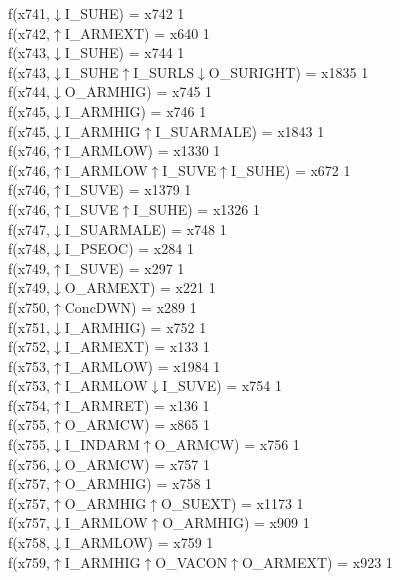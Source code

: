 f(x741,$\downarrow$I\_SUHE) = x742 {1} \\
f(x742,$\uparrow$I\_ARMEXT) = x640 {1} \\
f(x743,$\downarrow$I\_SUHE) = x744 {1} \\
f(x743,$\downarrow$I\_SUHE$\uparrow$I\_SURLS$\downarrow$O\_SURIGHT) = x1835 {1} \\
f(x744,$\downarrow$O\_ARMHIG) = x745 {1} \\
f(x745,$\downarrow$I\_ARMHIG) = x746 {1} \\
f(x745,$\downarrow$I\_ARMHIG$\uparrow$I\_SUARMALE) = x1843 {1} \\
f(x746,$\uparrow$I\_ARMLOW) = x1330 {1} \\
f(x746,$\uparrow$I\_ARMLOW$\uparrow$I\_SUVE$\uparrow$I\_SUHE) = x672 {1} \\
f(x746,$\uparrow$I\_SUVE) = x1379 {1} \\
f(x746,$\uparrow$I\_SUVE$\uparrow$I\_SUHE) = x1326 {1} \\
f(x747,$\downarrow$I\_SUARMALE) = x748 {1} \\
f(x748,$\downarrow$I\_PSEOC) = x284 {1} \\
f(x749,$\uparrow$I\_SUVE) = x297 {1} \\
f(x749,$\downarrow$O\_ARMEXT) = x221 {1} \\
f(x750,$\uparrow$ConcDWN) = x289 {1} \\
f(x751,$\downarrow$I\_ARMHIG) = x752 {1} \\
f(x752,$\downarrow$I\_ARMEXT) = x133 {1} \\
f(x753,$\uparrow$I\_ARMLOW) = x1984 {1} \\
f(x753,$\uparrow$I\_ARMLOW$\downarrow$I\_SUVE) = x754 {1} \\
f(x754,$\uparrow$I\_ARMRET) = x136 {1} \\
f(x755,$\uparrow$O\_ARMCW) = x865 {1} \\
f(x755,$\downarrow$I\_INDARM$\uparrow$O\_ARMCW) = x756 {1} \\
f(x756,$\downarrow$O\_ARMCW) = x757 {1} \\
f(x757,$\uparrow$O\_ARMHIG) = x758 {1} \\
f(x757,$\uparrow$O\_ARMHIG$\uparrow$O\_SUEXT) = x1173 {1} \\
f(x757,$\downarrow$I\_ARMLOW$\uparrow$O\_ARMHIG) = x909 {1} \\
f(x758,$\downarrow$I\_ARMLOW) = x759 {1} \\
f(x759,$\uparrow$I\_ARMHIG$\uparrow$O\_VACON$\uparrow$O\_ARMEXT) = x923 {1} \\
